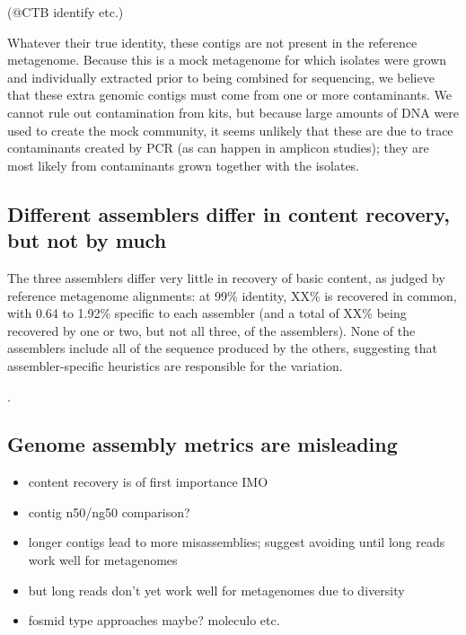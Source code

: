 \documentclass[10pt,a4paper,twocolumn]{article}
\begin{document}
(@CTB identify etc.)


Whatever their true identity, these contigs are not present in the
reference metagenome. Because this is a mock metagenome for which
isolates were grown and individually extracted prior to being combined
for sequencing, we believe that these extra genomic contigs must come
from one or more contaminants.  We cannot rule out contamination from
kits, but because large amounts of DNA were used to create the mock
community, it seems unlikely that these are due to trace contaminants
created by PCR (as can happen in amplicon studies); they are most
likely from contaminants grown together with the isolates.

\subsection*{Different assemblers differ in content recovery, but not by much}

The three assemblers differ very little in recovery of basic content,
as judged by reference metagenome alignments: at 99\% identity, XX\%
is recovered in common, with 0.64 to 1.92\% specific to each assembler
(and a total of XX\% being recovered by one or two, but not all three,
of the assemblers). None of the assemblers include all of the sequence
produced by the others, suggesting that assembler-specific heuristics
are responsible for the variation.

. %

\subsection*{Genome assembly metrics are misleading}

\begin{itemize}
\item content recovery is of first importance IMO
\item contig n50/ng50 comparison?
\item longer contigs lead to more misassemblies; suggest avoiding until long reads work well for metagenomes
\item but long reads don't yet work well for metagenomes due to diversity
\item fosmid type approaches maybe? moleculo etc.
\end{itemize}
\end{document}
